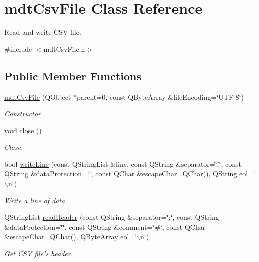 \hypertarget{classmdt_csv_file}{
\section{mdtCsvFile Class Reference}
\label{classmdt_csv_file}
}


Read and write CSV file.  




{\ttfamily \#include $<$mdtCsvFile.h$>$}

\subsection*{Public Member Functions}
\begin{DoxyCompactItemize}
\item 
\hyperlink{classmdt_csv_file_aaca142b18a4f436548e17fbef755e2d5}{mdtCsvFile} (QObject $\ast$parent=0, const QByteArray \&fileEncoding=\char`\"{}UTF-\/8\char`\"{})
\begin{DoxyCompactList}\small\item\em Constructor. \end{DoxyCompactList}\item 
void \hyperlink{classmdt_csv_file_abfe09c325401ac9ca39c9d2329d6bc9c}{close} ()
\begin{DoxyCompactList}\small\item\em Close. \end{DoxyCompactList}\item 
bool \hyperlink{classmdt_csv_file_a0e85f46ffdc4e44c8974c485abcc48b8}{writeLine} (const QStringList \&line, const QString \&separator=\char`\"{};\char`\"{}, const QString \&dataProtection=\char`\"{}\char`\"{}, const QChar \&escapeChar=QChar(), QString eol=\char`\"{}$\backslash$n\char`\"{})
\begin{DoxyCompactList}\small\item\em Write a line of data. \end{DoxyCompactList}\item 
QStringList \hyperlink{classmdt_csv_file_a4010d76497d8f5d2a85171025d31f100}{readHeader} (const QString \&separator=\char`\"{};\char`\"{}, const QString \&dataProtection=\char`\"{}\char`\"{}, const QString \&comment=\char`\"{}\#\char`\"{}, const QChar \&escapeChar=QChar(), QByteArray eol=\char`\"{}$\backslash$n\char`\"{})
\begin{DoxyCompactList}\small\item\em Get CSV file's header. \end{DoxyCompactList}\item 

\end{DoxyCompactItemize}
